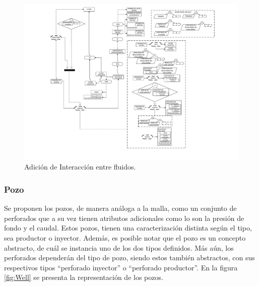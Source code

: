 \begin{figure}[h]
	\centering%
	\includegraphics[width=0.9\linewidth]{Kap4/Equilibrium.pdf}%
	\caption{Adición de Interacción entre fluidos.} \label{fig:Contact}
\end{figure}
\subsubsection{Pozo}\label{sec:PS_Well}
Se proponen los pozos, de manera análoga a la malla, como un conjunto de perforados que a su vez tienen atributos adicionales como lo son la presión de fondo y el caudal. Estos pozos, tienen una caracterización distinta según el tipo, sea productor o inyector. Además, es posible notar que el pozo es un concepto abstracto, de cuál se instancia uno de los dos tipos definidos. Más aún, los perforados dependerán del tipo de pozo, siendo estos también abstractos, con sus respectivos tipos ``perforado inyector'' o ``perforado productor''. En la figura \ref{fig:Well} se presenta la representación de los pozos.\\


